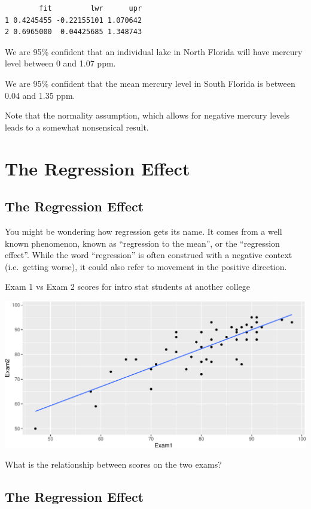 \documentclass[
  letterpaper,
  DIV=11,
  numbers=noendperiod]{scrreprt}
\begin{document}
\begin{verbatim}
        fit         lwr      upr
1 0.4245455 -0.22155101 1.070642
2 0.6965000  0.04425685 1.348743
\end{verbatim}

We are 95\% confident that an individual lake in North Florida will have
mercury level between 0 and 1.07 ppm.

We are 95\% confident that the mean mercury level in South Florida is
between 0.04 and 1.35 ppm.

Note that the normality assumption, which allows for negative mercury
levels leads to a somewhat nonsensical result.

\section{The Regression Effect}\label{the-regression-effect}

\subsection{The Regression Effect}\label{the-regression-effect-1}

You might be wondering how regression gets its name. It comes from a
well known phenomenon, known as ``regression to the mean'', or the
``regression effect''. While the word ``regression'' is often construed
with a negative context (i.e.~getting worse), it could also refer to
movement in the positive direction.

Exam 1 vs Exam 2 scores for intro stat students at another college

\includegraphics{Ch4_files/figure-pdf/unnamed-chunk-88-1.pdf}

What is the relationship between scores on the two exams?

\subsection{The Regression Effect}\label{the-regression-effect-2}
\end{document}
